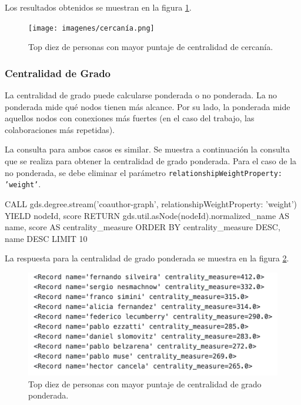 \documentclass[journal]{IEEEtran}
\begin{document}
Los resultados obtenidos se muestran en la figura \ref{fig:cercania}.

\begin{figure}[b]
	\centering
	\texttt{[image: imagenes/cercanía.png]}
	\caption{Top diez de personas con mayor puntaje de centralidad de cercanía.}
	\label{fig:cercania}
\end{figure}

\subsubsection{Centralidad de Grado}

La centralidad de grado puede calcularse ponderada o no ponderada. La no ponderada mide qué nodos tienen más alcance. Por su lado, la ponderada mide aquellos nodos con conexiones más fuertes (en el caso del trabajo, las colaboraciones más repetidas).

La consulta para ambos casos es similar. Se muestra a continuación la consulta que se realiza para obtener la centralidad de grado ponderada. Para el caso de la no ponderada, se debe eliminar el parámetro \texttt{{relationshipWeightProperty: 'weight'}}.

\begin{sflisting}[style=sparql,caption= Centralidad de Grado,label=codigo2]
	CALL gds.degree.stream('coauthor-graph',
	{relationshipWeightProperty: 'weight'})
	YIELD nodeId, score
	RETURN gds.util.asNode(nodeId).normalized_name AS name,
	score AS centrality_measure
	ORDER BY centrality_measure DESC, name DESC
	LIMIT 10
\end{sflisting}

La respuesta para la centralidad de grado ponderada se muestra en la figura \ref{fig:grado_ponderada}.

\begin{figure}[t]
	\centering
	\includegraphics[width=\linewidth]{imagenes/pesos_grado.png}
	\caption{Top diez de personas con mayor puntaje de centralidad de grado ponderada.}
	\label{fig:grado_ponderada}
\end{figure}
\end{document}
